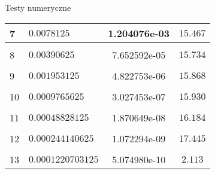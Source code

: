 \documentclass[9pt]{beamer}
\begin{document}
\begin{frame}{Testy numeryczne}
\begin{table}[]
{\begin{tabular}{|l|l|S|c|}
7  & $ 0.0078125       $ & 1.204076e-03 & $ 15.467 $  \\ [-1pt]   \hline & & & \\ [-10pt]
8  & $ 0.00390625      $ & 7.652592e-05 & $ 15.734 $  \\ [-1pt]   \hline & & & \\ [-10pt]
9  & $ 0.001953125     $ & 4.822753e-06 & $ 15.868 $  \\ [-1pt]   \hline & & & \\ [-10pt]
10 & $ 0.0009765625    $ & 3.027453e-07 & $ 15.930 $  \\ [-1pt]   \hline & & & \\ [-10pt]
11 & $ 0.00048828125   $ & 1.870649e-08 & $ 16.184 $  \\ [-1pt]   \hline & & & \\ [-10pt]
12 & $ 0.000244140625  $ & 1.072294e-09 & $ 17.445 $  \\ [-1pt]   \hline & & & \\ [-10pt]
13 & $ 0.0001220703125 $ & 5.074980e-10 & $ 2.113  $ \\ \hline %
            \end{tabular}
    	}
    \end{table}
\end{frame}
\end{document}
